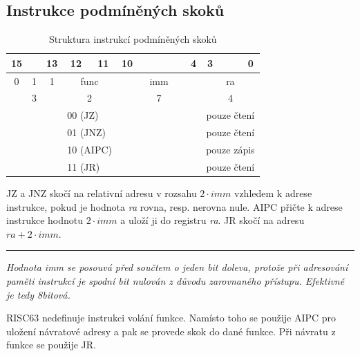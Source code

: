 \documentclass[
  digital, %
  color,   %
  table,   %
  twoside, %
  nolof,   %
  nolot,   %
]{fithesis3}
\begin{document}
\subsection{Instrukce podmíněných skoků}
\begin{table}[H]
\caption{Struktura instrukcí podmíněných skoků}
\begin{tabular}{ccllcccccccccccc}
15 &  & \multicolumn{1}{c}{13} & \multicolumn{1}{c}{12} & 11 & 10 &  &  &  &  &  & 4 & 3 &  &  & 0 \\ \hline
\multicolumn{1}{|c}{0} & 1 & \multicolumn{1}{c|}{1} & \multicolumn{2}{c|}{func} & \multicolumn{7}{c|}{imm} & \multicolumn{4}{c|}{ra} \\ \hline
\multicolumn{3}{c}{{\color[HTML]{656565} 3}} & \multicolumn{2}{c}{{\color[HTML]{656565} 2}} & \multicolumn{7}{c}{{\color[HTML]{656565} 7}} & \multicolumn{4}{c}{{\color[HTML]{656565} 4}} \\
 &  &  & \multicolumn{2}{l}{00 (JZ)} &  &  &  &  &  &  &  & \multicolumn{4}{c}{pouze čtení} \\
 &  &  & \multicolumn{2}{l}{01 (JNZ)} &  &  &  &  &  &  &  & \multicolumn{4}{c}{pouze čtení} \\
\multicolumn{1}{l}{} & \multicolumn{1}{l}{} &  & \multicolumn{2}{l}{10 (AIPC)} &  &  &  &  &  &  &  & \multicolumn{4}{c}{pouze zápis} \\
\multicolumn{1}{l}{} & \multicolumn{1}{l}{} &  & \multicolumn{2}{l}{11 (JR)} &  &  &  &  &  &  &  & \multicolumn{4}{c}{pouze čtení}
\end{tabular}
\end{table}

JZ a JNZ skočí na relativní adresu v rozsahu $2 \cdot imm$ vzhledem k adrese instrukce, pokud je hodnota \textit{ra} rovna, resp. nerovna nule. AIPC přičte k adrese instrukce hodnotu $2 \cdot imm$ a uloží ji do registru \textit{ra}. JR skočí na adresu $ra + 2 \cdot imm$.

\noindent\rule{\textwidth}{1pt}
{\itshape
Hodnota {\normalfont imm} se posouvá před součtem o jeden bit doleva, protože při adresování paměti instrukcí je spodní bit nulován z důvodu zarovnaného přístupu. Efektivně je tedy 8bitová.

RISC63 nedefinuje instrukci volání funkce. Namísto toho se použije AIPC pro uložení návratové adresy a pak se provede skok do dané funkce. Při návratu z funkce se použije JR.
}
\end{document}
